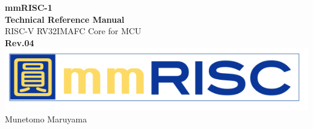 \begin{titlepage}
    \begin{center}
        \vspace*{5cm}
        {\Huge \textbf{mmRISC-1}}\\[1cm]
        {\Huge \textbf{Technical Reference Manual}}\\[2cm]
        {\LARGE{RISC-V RV32IMAFC Core for MCU}}\\[3cm]
        {\LARGE \textbf{Rev.04}}\\[3cm]
        \includegraphics[width=0.75\columnwidth]{./Logo/mmRISC_Logo.png}\\[2cm]
        {\LARGE{Munetomo Maruyama}}\\[0.5cm]
    \end{center} 
\end{titlepage}
